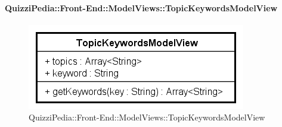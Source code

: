 \paragraph{QuizziPedia::Front-End::ModelViews::TopicKeywordsModelView}
				
				\label{QuizziPedia::Front-End::ModelViews::TopicKeywordsModelView}
				
				\begin{figure}[ht]
					\centering
					\includegraphics[scale=0.5,keepaspectratio]{UML/Classi/Front-End/QuizziPedia_Front-end_ModelView_TopicKeywordsModelView.png}
					\caption{QuizziPedia::Front-End::ModelViews::TopicKeywordsModelView}
				\end{figure} \FloatBarrier
				
